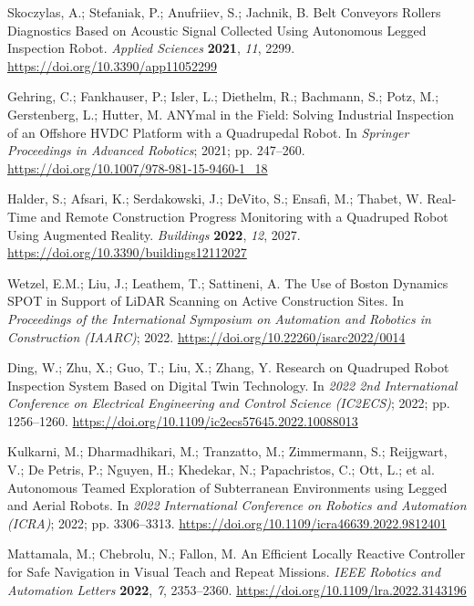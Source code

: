 Skoczylas, A.; Stefaniak, P.; Anufriiev, S.; Jachnik, B. Belt Conveyors Rollers Diagnostics Based on Acoustic Signal Collected Using Autonomous Legged Inspection Robot. \emph{Applied Sciences} \textbf{2021}, \emph{11}, 2299. \url{https://doi.org/10.3390/app11052299}

Gehring, C.; Fankhauser, P.; Isler, L.; Diethelm, R.; Bachmann, S.; Potz, M.; Gerstenberg, L.; Hutter, M. ANYmal in the Field: Solving Industrial Inspection of an Offshore HVDC Platform with a Quadrupedal Robot. In \emph{Springer Proceedings in Advanced Robotics}; 2021; pp. 247--260. \url{https://doi.org/10.1007/978-981-15-9460-1_18}

Halder, S.; Afsari, K.; Serdakowski, J.; DeVito, S.; Ensafi, M.; Thabet, W. Real-Time and Remote Construction Progress Monitoring with a Quadruped Robot Using Augmented Reality. \emph{Buildings} \textbf{2022}, \emph{12}, 2027. \url{https://doi.org/10.3390/buildings12112027}

Wetzel, E.M.; Liu, J.; Leathem, T.; Sattineni, A. The Use of Boston Dynamics SPOT in Support of LiDAR Scanning on Active Construction Sites. In \emph{Proceedings of the International Symposium on Automation and Robotics in Construction (IAARC)}; 2022. \url{https://doi.org/10.22260/isarc2022/0014}

Ding, W.; Zhu, X.; Guo, T.; Liu, X.; Zhang, Y. Research on Quadruped Robot Inspection System Based on Digital Twin Technology. In \emph{2022 2nd International Conference on Electrical Engineering and Control Science (IC2ECS)}; 2022; pp. 1256--1260. \url{https://doi.org/10.1109/ic2ecs57645.2022.10088013}

Kulkarni, M.; Dharmadhikari, M.; Tranzatto, M.; Zimmermann, S.; Reijgwart, V.; De Petris, P.; Nguyen, H.; Khedekar, N.; Papachristos, C.; Ott, L.; et al. Autonomous Teamed Exploration of Subterranean Environments using Legged and Aerial Robots. In \emph{2022 International Conference on Robotics and Automation (ICRA)}; 2022; pp. 3306--3313. \url{https://doi.org/10.1109/icra46639.2022.9812401}

Mattamala, M.; Chebrolu, N.; Fallon, M. An Efficient Locally Reactive Controller for Safe Navigation in Visual Teach and Repeat Missions. \emph{IEEE Robotics and Automation Letters} \textbf{2022}, \emph{7}, 2353--2360. \url{https://doi.org/10.1109/lra.2022.3143196}

